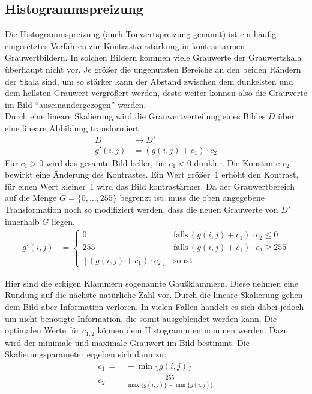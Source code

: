 \subsection{Histogrammspreizung}
Die Histogrammspreizung (auch Tonwertspreizung genannt) ist ein häufig eingesetztes Verfahren zur Kontrastverstärkung in kontrastarmen Grauwertbildern. In solchen Bildern kommen viele Grauwerte der Grauwertskala überhaupt nicht vor. Je größer die ungenutzten Bereiche an den beiden Rändern der Skala sind, um so stärker kann der Abstand zwischen dem dunkelsten und dem hellsten Grauwert vergrößert werden, desto weiter können also die Grauwerte im Bild "`auseinandergezogen"' werden.\\
Durch eine lineare Skalierung wird die Grauwertverteilung eines Bildes $D$ über eine lineare Abbildung transformiert.
\begin{align}
D &\rightarrow D' \\
g'(i,j)&=(g(i,j)+c_1)\cdot c_2
\end{align}
Für $c_1 > 0$ wird das gesamte Bild heller, für $c_1 < 0$ dunkler. Die Konstante $c_2$
bewirkt eine Änderung des Kontrastes. Ein Wert größer~$1$ erhöht den Kontrast, für einen
Wert kleiner~$1$ wird das Bild kontrastärmer. Da der Grauwertbereich auf die Menge $G=\{0, \ldots, 255\}$
begrenzt ist, muss die oben angegebene Transformation noch so modifiziert werden, dass
die neuen Grauwerte von $D'$ innerhalb $G$ liegen.
\begin{align}
g'(i, j) &= \begin{cases} 0 &\text{falls} \, (g(i,j)+c_1)\cdot c_2 \leq 0 \\
255 &\text{falls} \, (g(i,j)+c_1)\cdot c_2 \geq 255\\
[(g(i,j)+c_1)\cdot c_2] &\text{sonst}
\end{cases}
\label{eq:histspreizung}
\end{align}

Hier sind die eckigen Klammern sogenannte Gaußklammern. Diese nehmen eine Rundung auf die
nächste natürliche Zahl vor. Durch die lineare Skalierung gehen dem Bild aber Information
verloren. In vielen Fällen handelt es sich dabei jedoch um nicht benötigte Information, die somit ausgeblendet werden kann.
Die optimalen Werte für $c_{1,2}$ können dem Histogramm entnommen werden. Dazu wird der 
minimale und maximale Grauwert im Bild bestimmt. Die Skalierungsparameter ergeben sich dann zu:
\begin{align}
c_1\,=&\, -\min\{g(i,j)\} \nonumber\\[1.5em]
c_2\,=&\, \frac{255}{\max\{g(i,j)\}-\min\{g(i,j)\}}\nonumber
\end{align}


